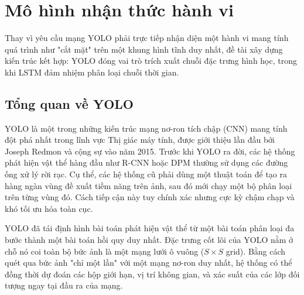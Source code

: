 	\section{Mô hình nhận thức hành vi}
	
	Thay vì yêu cầu mạng YOLO phải trực tiếp nhận diện một hành vi mang tính quá trình như "cắt mặt" trên một khung hình tĩnh duy nhất, đề tài xây dựng kiến trúc kết hợp: YOLO đóng vai trò trích xuất chuỗi đặc trưng hình học, trong khi LSTM đảm nhiệm phân loại chuỗi thời gian.
	
	\subsection{Tổng quan về YOLO}
	
	YOLO là một trong những kiến trúc mạng nơ-ron tích chập (CNN) mang tính đột phá nhất trong lĩnh vực Thị giác máy tính, được giới thiệu lần đầu bởi Joseph Redmon và cộng sự vào năm 2015\cite{Redmon2015YouOL}. Trước khi YOLO ra đời, các hệ thống phát hiện vật thể hàng đầu như R-CNN hoặc DPM thường sử dụng các đường ống xử lý rời rạc\cite{Redmon2015YouOL}. Cụ thể, các hệ thống cũ phải dùng một thuật toán để tạo ra hàng ngàn vùng đề xuất tiềm năng trên ảnh, sau đó mới chạy một bộ phân loại trên từng vùng đó\cite{Redmon2015YouOL}. Cách tiếp cận này tuy chính xác nhưng cực kỳ chậm chạp và khó tối ưu hóa toàn cục\cite{Redmon2015YouOL}.
	
	YOLO đã tái định hình bài toán phát hiện vật thể từ một bài toán phân loại đa bước thành một bài toán hồi quy duy nhất\cite{Redmon2015YouOL}. Đặc trưng cốt lõi của YOLO nằm ở chỗ nó coi toàn bộ bức ảnh là một mạng lưới ô vuông ($S \times S$ grid)\cite{Redmon2015YouOL}. Bằng cách quét qua bức ảnh "chỉ một lần" với một mạng nơ-ron duy nhất, hệ thống có thể đồng thời dự đoán các hộp giới hạn, vị trí không gian, và xác suất của các lớp đối tượng ngay tại đầu ra của mạng\cite{Redmon2015YouOL}. 
	
